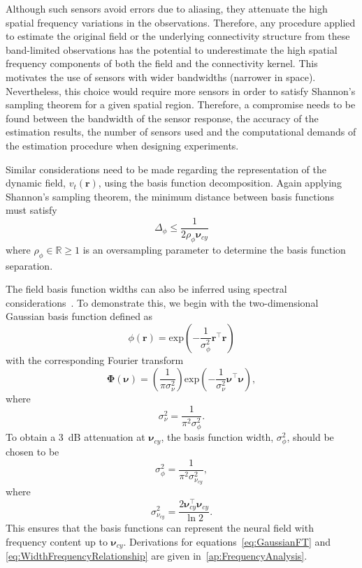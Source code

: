 \documentclass[10pt]{article}
\begin{document}
Although such sensors avoid errors due to aliasing, they attenuate the high spatial frequency variations in the observations. Therefore, any procedure applied to estimate the original field or the underlying connectivity structure from these band-limited observations has the potential to underestimate the high spatial frequency components of both the field and the connectivity kernel. This motivates the use of sensors with wider bandwidths (narrower in space). Nevertheless, this choice would require more sensors in order to satisfy Shannon's sampling theorem for a given spatial region. Therefore, a compromise needs to be found between the bandwidth of the sensor response, the accuracy of the estimation results, the number of sensors used and the computational demands of the estimation procedure when designing experiments.

Similar considerations need to be made regarding the representation of the dynamic field, $v_t(\mathbf{r})$, using the basis function decomposition. Again applying Shannon's sampling theorem, the minimum distance between basis functions must satisfy 
\begin{equation}\label{eq:BasisFunctionSeparation}
	\Delta_{\phi} \leq \frac{1}{2\rho_{\phi}\boldsymbol{\nu}_{cy}}
\end{equation}
where $\rho_{\phi} \in \mathbb{R} \ge 1$ is an oversampling parameter to determine the basis function separation. 

The field basis function widths can also be inferred using spectral considerations~\cite{Sanner1992,Scerri2009}. To demonstrate this, we begin with the two-dimensional Gaussian basis function defined as
\begin{equation}\label{eq:BasisFunctionAtOrigin}
 \phi(\mathbf r)=\mathrm{exp}\left({-\frac{1}{\sigma_{\phi}^2} \mathbf r^\top\mathbf r}\right)
\end{equation}
with the corresponding Fourier transform
\begin{equation}\label{eq:GaussianFT}
\boldsymbol\Phi(\boldsymbol \nu)=\left(\frac{1}{\pi\sigma_{\nu}^2}\right)\mathrm{exp}\left(-\frac{1}{\sigma_{\nu}^2}\boldsymbol\nu^\top \boldsymbol\nu\right),
\end{equation}
where 
\begin{equation}\label{eq:GaussianFTWidth}
	\sigma^2_{\nu} = \frac{1}{\pi^2\sigma_{\phi}^2}. 
\end{equation}
To obtain a 3~dB attenuation at $\boldsymbol\nu_{cy}$, the basis function width, $\sigma^2_{\phi}$, should be chosen to be
\begin{equation}\label{eq:WidthCutOffRelationship}
 \sigma^2_{\phi}= \frac{1}{\pi^2\sigma_{\nu_{cy}}^2},
\end{equation}
where
\begin{equation}\label{eq:WidthFrequencyRelationship}
 \sigma^2_{\nu_{cy}}= \frac{2\boldsymbol\nu_{cy}^\top \boldsymbol\nu_{cy}}{\ln2}.
\end{equation}
This ensures that the basis functions can represent the neural field with frequency content up to $\boldsymbol\nu_{cy}$. Derivations for equations~\ref{eq:GaussianFT} and \ref{eq:WidthFrequencyRelationship} are given in~\ref{ap:FrequencyAnalysis}.
\end{document}

